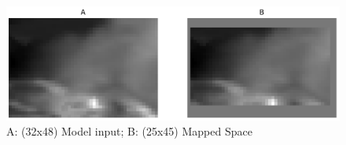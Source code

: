 \begin{figure}[!h]

\includegraphics[]{figures/spatial_mapping.png}
\caption{A: (32x48) Model input; B: (25x45) Mapped Space}
\end{figure}